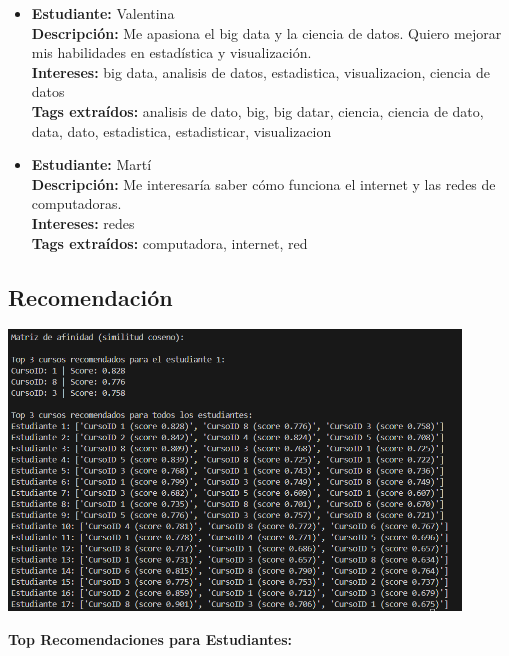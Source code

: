 \documentclass[12pt]{article}
\begin{document}
\begin{itemize}
    \item \textbf{Estudiante:} Valentina\\
    \textbf{Descripción:} Me apasiona el big data y la ciencia de datos. Quiero mejorar mis habilidades en estadística y visualización.\\
    \textbf{Intereses:} big data, analisis de datos, estadistica, visualizacion, ciencia de datos\\
    \textbf{Tags extraídos:} analisis de dato, big, big datar, ciencia, ciencia de dato, data, dato, estadistica, estadisticar, visualizacion

    \item \textbf{Estudiante:} Martí\\
    \textbf{Descripción:} Me interesaría saber cómo funciona el internet y las redes de computadoras.\\
    \textbf{Intereses:} redes\\
    \textbf{Tags extraídos:} computadora, internet, red
\end{itemize}

\subsection{Recomendación}

\begin{center}
    \includegraphics[width=0.9\textwidth]{recomendaciones.png}
\end{center}

\textbf{Top Recomendaciones para Estudiantes:}
\end{document}
